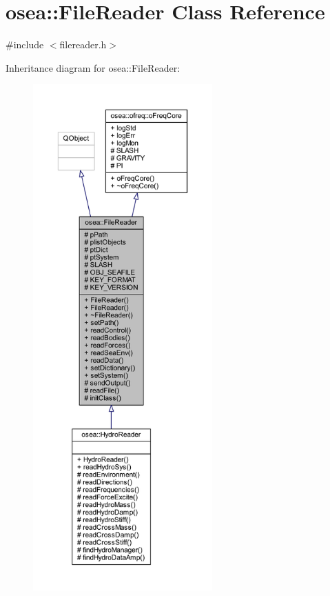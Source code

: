 \hypertarget{classosea_1_1_file_reader}{\section{osea\-:\-:File\-Reader Class Reference}
\label{classosea_1_1_file_reader}
}


{\ttfamily \#include $<$filereader.\-h$>$}



Inheritance diagram for osea\-:\-:File\-Reader\-:
\nopagebreak
\begin{figure}[H]
\begin{center}
\leavevmode
\includegraphics[height=550pt]{classosea_1_1_file_reader__inherit__graph}
\end{center}
\end{figure}
